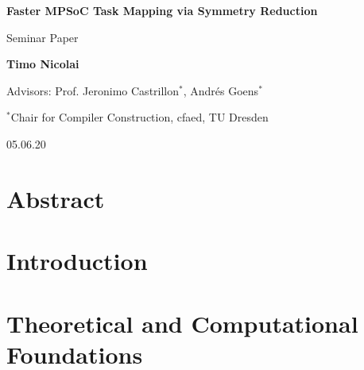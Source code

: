 \newcommand{\inputtex}[1]{}
\newcommand{\inputressource}[1]{}
\newcommand{\includeressource}[2][]{\texttt{[image: ../resources/pdf/\#2]}}

\inputtex{preamble.tex}



\begin{titlepage}
   \begin{center}
       \vspace*{1cm}

       \Huge
       \textbf{Faster MPSoC Task Mapping via Symmetry Reduction}

       \vspace{0.5cm}

       \LARGE
       Seminar Paper

       \vspace{1.5cm}

       \textbf{Timo Nicolai}

       \vfill

       Advisors: Prof. Jeronimo Castrillon$^*$, Andrés Goens$^*$

       \vspace{0.8cm}

       \Large
       $^*$Chair for Compiler Construction, cfaed, TU Dresden

       \vspace{0.8cm}

       05.06.20
   \end{center}
\end{titlepage}

\tableofcontents

\newpage

\thispagestyle{empty}
\setcounter{page}{1}

\chapter*{Abstract}
\label{chap:abstract}

\inputtex{abstract.tex}

\chapter{Introduction}
\label{chap:mot}

\inputtex{mot.tex}

\chapter{Theoretical and Computational Foundations}
\label{chap:theo}

